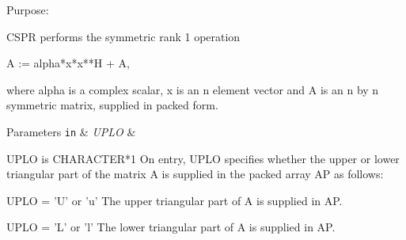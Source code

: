  \begin{DoxyParagraph}{Purpose\+: }
\begin{DoxyVerb} CSPR    performs the symmetric rank 1 operation

    A := alpha*x*x**H + A,

 where alpha is a complex scalar, x is an n element vector and A is an
 n by n symmetric matrix, supplied in packed form.\end{DoxyVerb}
 
\end{DoxyParagraph}

\begin{DoxyParams}[1]{Parameters}
\mbox{\tt in}  & {\em U\+P\+L\+O} & \begin{DoxyVerb}          UPLO is CHARACTER*1
           On entry, UPLO specifies whether the upper or lower
           triangular part of the matrix A is supplied in the packed
           array AP as follows:

              UPLO = 'U' or 'u'   The upper triangular part of A is
                                  supplied in AP.

              UPLO = 'L' or 'l'   The lower triangular part of A is
                                  supplied in AP.


\end{DoxyVerb}
\end{DoxyParams}
